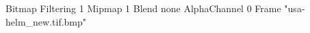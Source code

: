{Bitmap
	{Filtering 1}
	{Mipmap 1}
	{Blend none}
	{AlphaChannel 0}
	{Frame "usa-helm_new.tif.bmp"}
}
